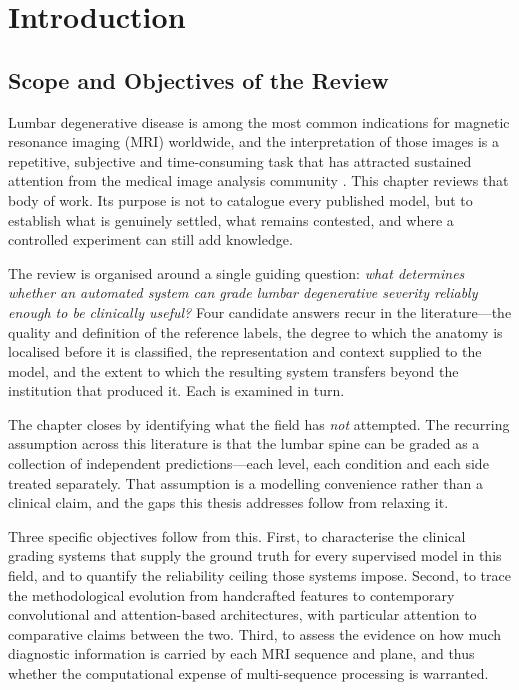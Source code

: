 \section{Introduction}
\label{sec:lr-intro}

\subsection{Scope and Objectives of the Review}
\label{sec:lr-scope}

Lumbar degenerative disease is among the most common indications for magnetic
resonance imaging (MRI) worldwide, and the interpretation of those images is a
repetitive, subjective and time-consuming task that has attracted sustained
attention from the medical image analysis community \cite{lee2024artificial,zhang2024a}.
This chapter reviews that body of work. Its purpose is not to catalogue every
published model, but to establish what is genuinely settled, what remains
contested, and where a controlled experiment can still add knowledge.

The review is organised around a single guiding question: \emph{what determines
whether an automated system can grade lumbar degenerative severity reliably
enough to be clinically useful?} Four candidate answers recur in the
literature---the quality and definition of the reference labels, the degree to
which the anatomy is localised before it is classified, the representation and
context supplied to the model, and the extent to which the resulting system
transfers beyond the institution that produced it. Each is examined in turn.

The chapter closes by identifying what the field has \emph{not} attempted. The
recurring assumption across this literature is that the lumbar spine can be
graded as a collection of independent predictions---each level, each condition
and each side treated separately. That assumption is a modelling convenience
rather than a clinical claim, and the gaps this thesis addresses follow from
relaxing it.

Three specific objectives follow from this. First, to characterise the clinical
grading systems that supply the ground truth for every supervised model in this
field, and to quantify the reliability ceiling those systems impose. Second, to
trace the methodological evolution from handcrafted features to contemporary
convolutional and attention-based architectures, with particular attention to
comparative claims between the two. Third, to assess the evidence on how much
diagnostic information is carried by each MRI sequence and plane, and thus
whether the computational expense of multi-sequence processing is warranted.

